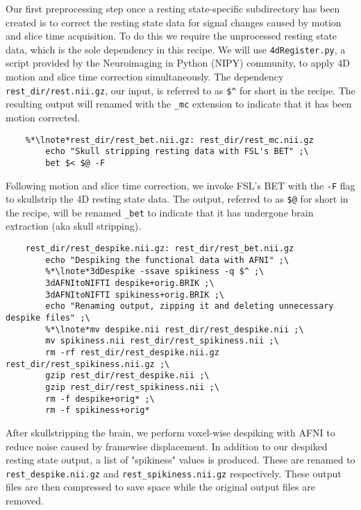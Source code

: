 Our first preprocessing step once a resting state-specific subdirectory has been created is to correct the resting state data for signal changes caused by motion and slice time acquisition. To do this we require the unprocessed resting state data, which is the sole dependency in this recipe.   We will use \texttt{4dRegister.py}, a script provided by the Neuroimaging in Python (NIPY) community, to apply 4D motion and slice time correction simultaneously. The dependency \texttt{rest_dir/rest.nii.gz}, our input, is referred to as \texttt{\$\^} for short in the recipe. The resulting output will renamed with the  \texttt{_mc} extension to indicate that it has been motion corrected.

\begin{lstlisting}
	%*\lnote*rest_dir/rest_bet.nii.gz: rest_dir/rest_mc.nii.gz
		echo "Skull stripping resting data with FSL's BET" ;\
		bet $< $@ -F
\end{lstlisting}

 Following motion and slice time correction, we invoke FSL's BET with the \texttt{-F} flag to skullstrip the 4D resting state data. The output, referred to as \texttt{\$@} for short in the recipe, will be renamed  \texttt{_bet} to indicate that it has undergone brain extraction (aka skull stripping).

\begin{lstlisting}
	rest_dir/rest_despike.nii.gz: rest_dir/rest_bet.nii.gz
		echo "Despiking the functional data with AFNI" ;\
		%*\lnote*3dDespike -ssave spikiness -q $^ ;\
		3dAFNItoNIFTI despike+orig.BRIK ;\
		3dAFNItoNIFTI spikiness+orig.BRIK ;\
		echo "Renaming output, zipping it and deleting unnecessary despike files" ;\
		%*\lnote*mv despike.nii rest_dir/rest_despike.nii ;\
		mv spikiness.nii rest_dir/rest_spikiness.nii ;\
		rm -rf rest_dir/rest_despike.nii.gz rest_dir/rest_spikiness.nii.gz ;\
		gzip rest_dir/rest_despike.nii ;\
		gzip rest_dir/rest_spikiness.nii ;\
		rm -f despike+orig* ;\
		rm -f spikiness+orig*
\end{lstlisting}

\lnum{8} After skullstripping the brain, we perform voxel-wise despiking with AFNI to reduce noise caused by framewise displacement.  In addition to our despiked resting state output, a list of "spikiness" values is produced. These are renamed to \texttt{rest_despike.nii.gz} and \texttt{rest_spikiness.nii.gz} respectively. These output files are then compressed to save space while the original output files are removed.

